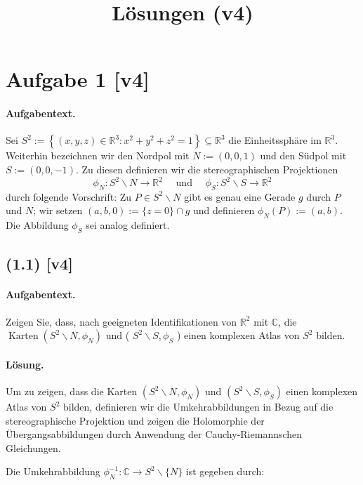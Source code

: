 \documentclass[11pt,a4paper]{article}
\title{Lösungen (v4)}
\date{}
\begin{document}
\maketitle

\section*{Aufgabe 1 [v4]}
\paragraph{Aufgabentext.}
Sei $S^2:=\left\{(x, y, z) \in \mathbb{R}^3: x^2+y^2+z^2=1\right\} \subseteq \mathbb{R}^3$ die Einheitssphäre im $\mathbb{R}^3$. Weiterhin bezeichnen wir den Nordpol mit $N:=(0,0,1)$ und den Südpol mit $S:=(0,0,-1)$. Zu diesen definieren wir die stereographischen Projektionen
$$
\phi_N: S^2 \backslash N \rightarrow \mathbb{R}^2 \quad \text { und } \quad \phi_S: S^2 \backslash S \rightarrow \mathbb{R}^2
$$
durch folgende Vorschrift: Zu $P \in S^2 \backslash N$ gibt es genau eine Gerade $g$ durch $P$ und $N$; wir setzen $(a, b, 0):=\{z=0\} \cap g$ und definieren $\phi_N(P):=(a, b)$. Die Abbildung $\phi_S$ sei analog definiert.

\subsection*{(1.1) [v4]}
\paragraph{Aufgabentext.}
Zeigen Sie, dass, nach geeigneten Identifikationen von $\mathbb{R}^2$ mit $\mathbb{C}$, die $\operatorname{Karten}\left(S^2 \backslash N, \phi_N\right)$ und ( $S^2 \backslash S, \phi_S$ ) einen komplexen Atlas von $S^2$ bilden.

\paragraph{Lösung.}
Um zu zeigen, dass die Karten $\left(S^2 \backslash N, \phi_N\right)$ und $\left(S^2 \backslash S, \phi_S\right)$ einen komplexen Atlas von $S^2$ bilden, definieren wir die Umkehrabbildungen in Bezug auf die stereographische Projektion und zeigen die Holomorphie der Übergangsabbildungen durch Anwendung der Cauchy-Riemannschen Gleichungen.

Die Umkehrabbildung $\phi_N^{-1}: \mathbb{C} \to S^2 \backslash \{N\}$ ist gegeben durch:
\end{document}
